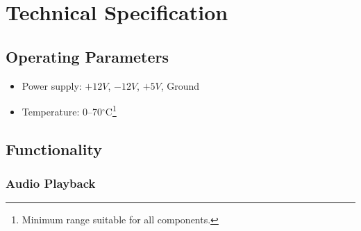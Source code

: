 \chapter{Technical Specification}

\section{Operating Parameters}

\begin{itemize}
\item Power supply: $+12V$, $-12V$, $+5V$, Ground
\item Temperature: 0--70$^{\circ}$C\footnote{Minimum range suitable for all components.}
\end{itemize}

\section{Functionality}
\label{sec:spec:functionality}

\subsection{Audio Playback}

